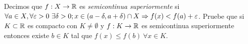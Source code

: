 
Decimos que $f:X\to\mathbb{R}$ es \emph{semicontinua superiormente} si
$\forall a\in X, \forall \varepsilon>0\ \exists \delta>0; x\in\left(a-\delta,a+\delta\right) \cap X \Rightarrow f(x) < f(a) + \varepsilon$.
Pruebe que si $K\subset\mathbb{R}$ es compacto con $K\neq\emptyset$ y $f:K\to\mathbb{R}$ es semicontinua superiormente entonces existe $b\in K$ tal que $f(x)\leq f(b)\ \forall x\in K$.